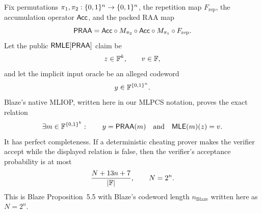 \begin{lemma}
\label{lem:blaze-native-praa-replay}
Fix permutations \(\pi_1,\pi_2:\{0,1\}^n\to\{0,1\}^n\), the repetition map
\(F_{\mathrm{rep}}\), the accumulation operator \(\mathsf{Acc}\), and the packed RAA
map
\[
  \mathsf{PRAA}=\mathsf{Acc}\circ M_{\pi_2}\circ\mathsf{Acc}\circ M_{\pi_1}\circ F_{\mathrm{rep}}.
\]
Let the public \(\mathsf{RMLE}[\mathsf{PRAA}]\) claim be
\[
  z\in\mathbb{F}^k,\qquad v\in\mathbb{F},
\]
and let the implicit input oracle be an alleged codeword
\[
  y\in\mathbb{F}^{\{0,1\}^n}.
\]
Blaze's native MLIOP, written here in our MLPCS notation, proves the exact
relation
\[
  \exists m\in\mathbb{F}^{\{0,1\}^k}:
  \qquad
  y=\mathsf{PRAA}(m)
  \quad\text{and}\quad
  \mathsf{MLE}(m)(z)=v.
\]
It has perfect completeness.  If a deterministic cheating prover makes the
verifier accept while the displayed relation is false, then the verifier's
acceptance probability is at most
\[
  \frac{N+13n+7}{|\mathbb{F}|},
  \qquad N=2^n.
\]
This is Blaze Proposition~5.5 with Blaze's codeword length \(n_{\mathrm{Blaze}}\)
written here as \(N=2^n\).
\end{lemma}

